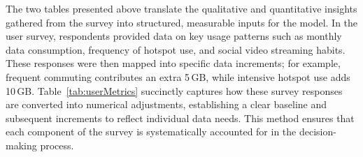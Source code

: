 \documentclass[conference]{IEEEtran}
\begin{document}
\begin{table}[ht!]
\centering
\scriptsize
\caption{Plan Evaluation Based on User Metrics}
\label{tab:planEvaluation}
\end{table}

The two tables presented above translate the qualitative and quantitative insights gathered from the survey into structured, measurable inputs for the model. In the user survey, respondents provided data on key usage patterns such as monthly data consumption, frequency of hotspot use, and social video streaming habits. These responses were then mapped into specific data increments; for example, frequent commuting contributes an extra 5\,GB, while intensive hotspot use adds 10\,GB. Table~\ref{tab:userMetrics} succinctly captures how these survey responses are converted into numerical adjustments, establishing a clear baseline and subsequent increments to reflect individual data needs. This method ensures that each component of the survey is systematically accounted for in the decision-making process.
\end{document}
